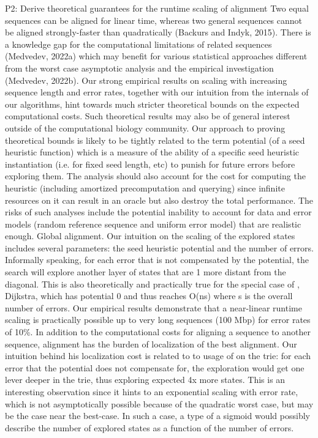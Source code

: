 P2: Derive theoretical guarantees for the runtime scaling of \A alignment Two
equal sequences can be aligned for linear time, whereas two general sequences
cannot be aligned strongly-faster than quadratically (Backurs and Indyk, 2015).
There is a knowledge gap for the computational limitations of related sequences
(Medvedev, 2022a) which may benefit for various statistical approaches different
from the worst case asymptotic analysis and the empirical investigation
(Medvedev, 2022b). Our strong empirical results on scaling with increasing
sequence length and error rates, together with our intuition from the internals
of our \A algorithms, hint towards much stricter theoretical bounds on the
expected computational costs. Such theoretical results may also be of general
interest outside of the computational biology community. Our approach to proving
theoretical bounds is likely to be tightly related to the term potential (of a
seed heuristic function) which is a measure of the ability of a specific seed
heuristic instantiation (i.e. for fixed seed length, etc) to punish for future
errors before exploring them. The analysis should also account for the cost for
computing the heuristic (including amortized precomputation and querying) since
infinite resources on it can result in an oracle but also destroy the total
performance. The risks of such analyses include the potential inability to
account for data and error models (random reference sequence and uniform error
model) that are realistic enough. Global alignment. Our intuition on the scaling
of the explored states includes several parameters: the seed heuristic potential
and the number of errors. Informally speaking, for each error that is not
compensated by the potential, the \A search will explore another layer of states
that are 1 more distant from the diagonal. This is also theoretically and
practically true for the special case of \A, Dijkstra, which has potential 0 and
thus reaches O(ns) where s is the overall number of errors. Our empirical
results demonstrate that a near-linear runtime scaling is practically possible
up to very long sequences (100 Mbp) for error rates of 10\%. In
addition to the computational costs for aligning a sequence to another sequence,
alignment has the burden of localization of the best alignment. Our intuition behind
his localization cost is related to to usage of \A on the trie: for each error
that the \A potential does not compensate for, the exploration would get one
lever deeper in the trie, thus exploring expected 4x more states. This is an
interesting observation since it hints to an exponential scaling with error
rate, which is not asymptotically possible because of the quadratic worst case,
but may be the case near the best-case. In such a case, a type of a sigmoid
would possibly describe the number of explored states as a function of the
number of errors.

